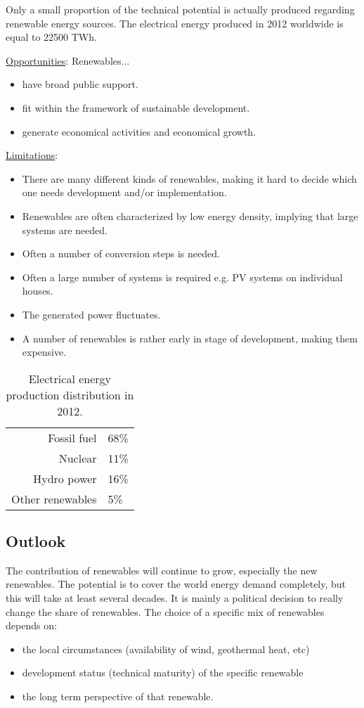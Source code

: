 \documentclass[a4paper,10pt]{article}
\begin{document}
Only a small proportion of the technical potential is actually produced regarding renewable energy sources. The electrical energy produced in 2012 worldwide is equal to 22500 TWh. \bigskip





\underline{Opportunities}: Renewables...
\begin{itemize}
 \item have broad public support.
 \item fit within the framework of sustainable development.
 \item generate economical activities and economical growth.
\end{itemize}
\underline{Limitations}:
\begin{itemize}
 \item There are many different kinds of renewables, making it hard to decide which one needs development and/or implementation.
 \item Renewables are often characterized by low energy density, implying that large systems are needed.
 \item Often a number of conversion steps is needed.
 \item Often a large number of systems is required e.g. PV systems on individual houses.
 \item The generated power fluctuates.
 \item A number of renewables is rather early in stage of development, making them expensive.
\end{itemize}

\begin{table}[ht] \centering
 \begin{tabular}{r|l}
  Fossil fuel & 68\% \\
  Nuclear & 11\% \\
  Hydro power & 16\% \\
  Other renewables & 5\%
 \end{tabular}
\caption{Electrical energy production distribution in 2012.}
\end{table}

\subsection{Outlook}
The contribution of renewables will continue to grow, especially the new renewables. The potential is to cover the world energy demand completely, but this will take at least several decades. It is mainly a political decision to really change the share of renewables. The choice of a specific mix of renewables depends on:
\begin{itemize}
 \item the local circumstances (availability of wind, geothermal heat, etc)
 \item development status (technical maturity) of the specific renewable
 \item the long term perspective of that renewable.
\end{itemize}
\end{document}
